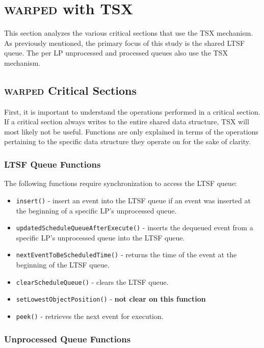 \documentclass[11pt]{book}
\begin{document}
\chapter{\textsc{warped} with TSX}

This section analyzes the various critical sections that use the TSX mechanism.
As previously mentioned, the primary focus of this study is the shared LTSF
queue.  The per LP unprocessed and processed queues also use the TSX mechanism.

\section{\textsc{warped} Critical Sections}

First, it is important to understand the operations performed in a critical
section.  If a critical section always writes to the entire shared data
structure, TSX will most likely not be useful.  Functions are only explained in
terms of the operations pertaining to the specific data structure they operate
on for the sake of clarity.  

\subsection{LTSF Queue Functions}

The following functions require synchronization to access the LTSF
queue:

\begin{itemize}
  \item\texttt{insert()} - insert an event into the LTSF queue if an event was inserted at
    the beginning of a specific LP's unprocessed queue.
  \item\texttt{updatedScheduleQueueAfterExecute()} - inserts the dequeued event from a
    specific LP's unprocessed queue into the LTSF queue.
  \item\texttt{nextEventToBeScheduledTime()} - returns the time of the event at the
    beginning of the LTSF queue.
  \item\texttt{clearScheduleQueue()} - clears the LTSF queue.
  \item\texttt{setLowestObjectPosition()} - \textbf{not clear on this function}
  \item\texttt{peek()} - retrieves the next event for execution.
\end{itemize}

\subsection{Unprocessed Queue Functions}
\end{document}
